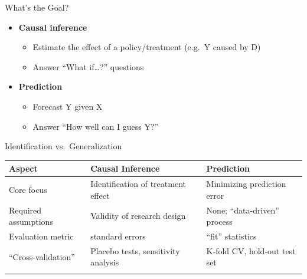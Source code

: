 \documentclass[
  ignorenonframetext,
]{beamer}
\providecommand{\tightlist}{%
  \setlength{\itemsep}{0pt}\setlength{\parskip}{0pt}}
\begin{document}
\begin{frame}{What's the Goal?}
\label{whats-the-goal}
\begin{itemize}
\tightlist
\item
  \textbf{Causal inference}

  \begin{itemize}
  \tightlist
  \item
    Estimate the effect of a policy/treatment (e.g.~Y caused by D)\\
  \item
    Answer ``What if\ldots?'' questions\\
  \end{itemize}
\item
  \textbf{Prediction}

  \begin{itemize}
  \tightlist
  \item
    Forecast Y given X\\
  \item
    Answer ``How well can I guess Y?''
  \end{itemize}
\end{itemize}
\end{frame}

\begin{frame}{Identification vs.~Generalization}
\label{identification-vs.-generalization}
\begin{longtable}[]{@{}
  >{\raggedright\arraybackslash}p{}
  >{\raggedright\arraybackslash}p{}
  >{\raggedright\arraybackslash}p{}@{}}
\toprule\noalign{}
\begin{minipage}[b]{\linewidth}\raggedright
Aspect
\end{minipage} & \begin{minipage}[b]{\linewidth}\raggedright
Causal Inference
\end{minipage} & \begin{minipage}[b]{\linewidth}\raggedright
Prediction
\end{minipage} \\
\midrule\noalign{}
\endhead
Core focus & Identification of treatment effect & Minimizing prediction
error \\
Required assumptions & Validity of research design & None;
``data-driven'' process \\
Evaluation metric & standard errors & ``fit'' statistics \\
``Cross‐validation'' & Placebo tests, sensitivity analysis & K‑fold CV,
hold‑out test set \\
\bottomrule\noalign{}
\end{longtable}
\end{frame}
\end{document}
